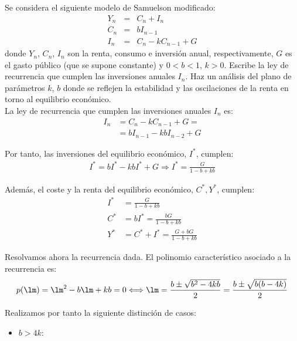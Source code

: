 \begin{ejercicio}
    Se considera el siguiente modelo de Samuelson modificado:
    \begin{equation*}
        \begin{array}{rcl}
            Y_n & = & C_n + I_n\\
            C_n & = & b I_{n-1}\\
            I_n & = & C_n - k C_{n-1} + G
        \end{array}
    \end{equation*}
    donde $Y_n$, $C_n$, $I_n$ son la renta, consumo e inversión anual, respectivamente, $G$ es el gasto público (que se supone
    constante) y $0 < b < 1$, $k > 0$. Escribe la ley de recurrencia que cumplen las inversiones anuales $I_n$. Haz un análisis
    del plano de parámetros $k$, $b$ donde se reflejen la estabilidad y las oscilaciones de la renta en torno al equilibrio
    económico.\\

    La ley de recurrencia que cumplen las inversiones anuales $I_n$ es:
    \begin{align*}
        I_n &= C_n - kC_{n-1} + G =\\
        &= bI_{n-1} - kbI_{n-2} + G
    \end{align*}

    Por tanto, las inversiones del equilibrio económico, $I^\ast$, cumplen:
    \begin{align*}
        I^\ast = bI^\ast - kbI^\ast + G
        \Longrightarrow I^\ast = \frac{G}{1-b+kb}
    \end{align*}

    Además, el coste y la renta del equilibrio económico, $C^\ast,Y^\ast$, cumplen:
    \begin{align*}
        I^\ast &= \frac{G}{1-b+kb} \\
        C^\ast &= bI^\ast = \frac{bG}{1-b+kb}\\
        Y^\ast &= C^\ast + I^\ast = \frac{G+bG}{1-b+kb}
    \end{align*}

    Resolvamos ahora la recurrencia dada. El polinomio característico asociado a la recurrencia es:
    \begin{equation*}
        p(\lm) = \lm^2 - b\lm + kb = 0
        \Longleftrightarrow
        \lm = \frac{b\pm \sqrt{b^2-4kb}}{2}
        = \frac{b\pm \sqrt{b(b-4k)}}{2}
    \end{equation*}

    Realizamos por tanto la siguiente distinción de casos:
    \begin{itemize}
        \item \ul{$b>4k$}:
        

\end{itemize}
\end{ejercicio}
